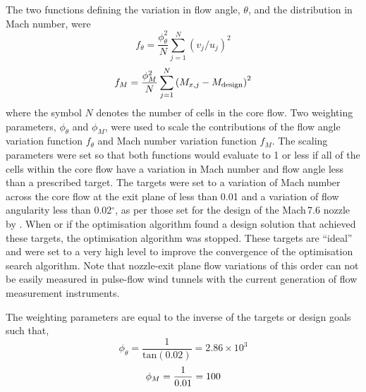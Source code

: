 \documentclass[12pt,a4paper]{article}
\begin{document}
The two functions defining the variation in flow angle, $\theta$, and the 
distribution in Mach number, were
%
\begin{equation}
 \label{e:secondary-obj-function-flow-divergence}
 f_{\theta} = \frac{\phi_{\theta}^2}{N} \sum\limits_{j=1}^N \left( v_j / u_j \right)^2
\end{equation}
%
\begin{equation}
 \label{e:secondary-obj-function-Mach}
 f_{M} = \frac{\phi_{M}^2}{N} \sum\limits_{j=1}^N \left( M_{x,j} - M_{\mathrm{design}} \right)^2
 \vspace{5mm}
\end{equation}
%
where the symbol $N$ denotes the number of cells in the core flow. Two 
weighting parameters, $\phi_{\theta}$ and $\phi_M$, were used to scale the 
contributions of the flow angle variation function $f_{\theta}$ and Mach 
number variation function $f_M$. The scaling parameters were set so that both
functions would evaluate to 1 or less if all of the cells within the core flow 
have a variation in Mach number and flow angle less than a prescribed target. 
The targets were set to a variation of Mach number across the core flow at the 
exit plane of less than 0.01 and a variation of flow angularity less than 0.02$^{\circ}$,
as per those set for the design of the Mach\,7.6 nozzle by .
When or if the optimisation algorithm found a design solution that achieved 
these targets, the optimisation algorithm was stopped. These targets are 
``ideal'' and were set to a very high level to improve the convergence of 
the optimisation search algorithm. Note that nozzle-exit plane flow 
variations of this order can not be easily measured in pulse-flow wind 
tunnels with the current generation of flow measurement instruments.

The weighting parameters are equal to the inverse of the targets or design 
goals such that,
%
\begin{equation}
 \label{e:weighting-params-flow-divergence}
 \phi_{\theta} = \frac{1}{\mathrm{tan}\left( 0.02 \right)} = 2.86 \times 10^3
\end{equation}
%
\begin{equation}
 \label{e:weighting-params-Mach}
 \phi_{M} = \frac{1}{0.01} = 100
 \vspace{5mm}
\end{equation}
%
\end{document}
